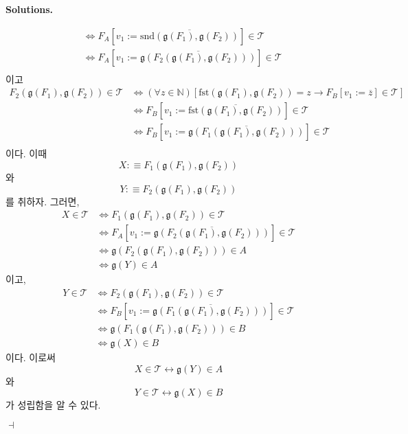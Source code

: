 \documentclass[12pt]{paper}
\newcommand{\gnum}
{ \mathfrak{g}
}
\newenvironment{context}[1][]
{ \noindent \textbf{{#1}.}
}
{ \hfill $ \dashv $
}
\begin{document}
\begin{context}[Solutions]
\begin{enumerate}
\begin{align*}
        & \iff F_A \left[ v_1 := \overline{\mathrm{snd} \left( \gnum \left( F_1 \right) , \gnum \left( F_2 \right) \right)} \right] \in \mathcal{T} \\
        & \iff F_A \left[ v_1 := \overline{\gnum \left( F_2 \left( \gnum \left( F_1 \right) , \gnum \left( F_2 \right) \right) \right)} \right] \in \mathcal{T} \\
      \end{align*}
      이고
      \begin{align*}
        F_2 \left( \gnum \left( F_1 \right) , \gnum \left( F_2 \right) \right) \in \mathcal{T}
        & \iff \left( \forall z \in \mathbb{N} \right) \left[ \mathrm{fst} \left( \gnum \left( F_1 \right) , \gnum \left( F_2 \right) \right) = z \rightarrow F_B \left[ v_1 := \overline{z} \right] \in \mathcal{T} \right] \\
        & \iff F_B \left[ v_1 := \overline{\mathrm{fst} \left( \gnum \left( F_1 \right) , \gnum \left( F_2 \right) \right)} \right] \in \mathcal{T} \\
        & \iff F_B \left[ v_1 := \overline{\gnum \left( F_1 \left( \gnum \left( F_1 \right) , \gnum \left( F_2 \right) \right) \right)} \right] \in \mathcal{T} \\
      \end{align*}
      이다.
      이때 $$X : \equiv F_1 \left( \gnum \left( F_1 \right) , \gnum \left( F_2 \right) \right)$$와 $$Y : \equiv F_2 \left( \gnum \left( F_1 \right) , \gnum \left( F_2 \right) \right)$$를 취하자.
      그러면,
      \begin{align*}
        X \in \mathcal{T}
        & \iff F_1 \left( \gnum \left( F_1 \right) , \gnum \left( F_2 \right) \right) \in \mathcal{T} \\
        & \iff F_A \left[ v_1 := \overline{\gnum \left( F_2 \left( \gnum \left( F_1 \right) , \gnum \left( F_2 \right) \right) \right)} \right] \in \mathcal{T} \\
        & \iff \gnum \left( F_2 \left( \gnum \left( F_1 \right) , \gnum \left( F_2 \right) \right) \right) \in A \\
        & \iff \gnum \left( Y \right) \in A
      \end{align*}
      이고,
      \begin{align*}
        Y \in \mathcal{T}
        & \iff F_2 \left( \gnum \left( F_1 \right) , \gnum \left( F_2 \right) \right) \in \mathcal{T} \\
        & \iff F_B \left[ v_1 := \overline{\gnum \left( F_1 \left( \gnum \left( F_1 \right) , \gnum \left( F_2 \right) \right) \right)} \right] \in \mathcal{T} \\
        & \iff \gnum \left( F_1 \left( \gnum \left( F_1 \right) , \gnum \left( F_2 \right) \right) \right) \in B \\
        & \iff \gnum \left( X \right) \in B
      \end{align*}
      이다.
      이로써 $$X \in \mathcal{T} \leftrightarrow \gnum \left( Y \right) \in A$$와 $$Y \in \mathcal{T} \leftrightarrow \gnum \left( X \right) \in B$$가 성립함을 알 수 있다.
    \end{enumerate}
  \end{context}
\end{document}
